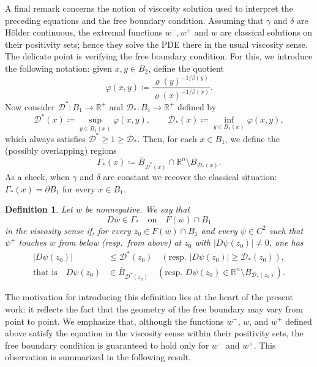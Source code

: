 \documentclass[reqno,11pt]{amsart}
\newtheorem{definition}{Definition}[section]
\newcommand{\1}{\mathds{1}}
\numberwithin{equation}{section}
\begin{document}
A final remark concerns the notion of viscosity solution used to interpret the preceding equations and the free boundary condition. Assuming that $\gamma$ and $\delta$ are H\"older continuous, the extremal functions $w^-, w^+$ and $w$ are classical solutions on their positivity sets; hence they solve the PDE there in the usual viscosity sense. The delicate point is verifying the free boundary condition. For this, we introduce the following notation: given $x,y\in B_2$, define the quotient
\[
    \varphi(x,y) \coloneqq 
        \frac{\varrho(y)^{-1/\beta(y)}}{\varrho(x)^{-1/\beta(x)}}.
\]
Now consider $\mathcal{D}^\ast \colon B_1 \to \mathbb{R}^+$ and $\mathcal{D}_\ast \colon B_1 \to \mathbb{R}^+$ defined by
\[
    \mathcal{D}^\ast(x) \coloneqq 
        \sup_{y \in B_1(x)} \varphi(x,y),
    \qquad 
    \mathcal{D}_\ast(x) \coloneqq 
        \inf_{y \in B_1(x)} \varphi(x,y),
\]
which always satisfies $\mathcal{D}^\ast \geq 1 \geq \mathcal{D}_\ast$. Then, for each $x \in B_1$, we define the (possibly overlapping) regions
$$
    \Gamma_\ast(x) \coloneqq \overline{B}_{\mathcal{D}^\ast(x)} \cap \mathbb{R}^n \setminus B_{\mathcal{D}_\ast(x)}.
$$
As a check, when $\gamma$ and $\delta$ are constant we recover the classical situation: $\Gamma_\ast(x) = \partial B_1$ for every $x \in B_1$.

\begin{definition}\label{sub-super solution property}
Let $\overline{w}$ be nonnegative. We say that 
$$
D\overline{w}\in \Gamma_\ast \quad \text{on} \quad F(\overline{w})\cap B_1
$$ 
\emph{in the viscosity sense} if, 
for every $z_0\in F(\overline{w})\cap B_1$ and every $\psi\in C^2$ such that $\psi^+$ touches $\overline{w}$ 
from below (resp.\ from above) at $z_0$ with $|D\psi(z_0)|\neq 0$, one has
\[
\begin{aligned}
|D\psi(z_0)| &\le \mathcal{D}^\ast(z_0) \quad (\text{resp.\ } |D\psi(z_0)| \ge \mathcal{D}_\ast(z_0)),\\
\text{that is}\quad 
D\psi(z_0) &\in \overline{B}_{\mathcal{D}^\ast(z_0)} 
\quad (\text{resp.\ } D\psi(z_0) \in \mathbb{R}^n \setminus B_{\mathcal{D}_\ast(z_0)}).
\end{aligned}
\]
\end{definition}

The motivation for introducing this definition lies at the heart of the present work: it reflects the fact that the geometry of the free boundary may vary from point to point. We emphasize that, although the functions $w^-$, $w$, and $w^+$ defined above satisfy the equation in the viscosity sense within their positivity sets, the free boundary condition is guaranteed to hold only for $w^-$ and $w^+$. This observation is summarized in the following result.
\end{document}
